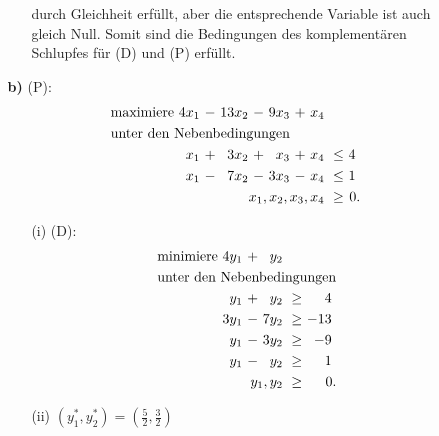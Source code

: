 \documentclass [a4paper,11pt]{article}
\begin{document}
\begin{enumerate}
\begin{enumerate}
\begin{enumerate}
                durch Gleichheit erfüllt, aber die entsprechende Variable ist auch gleich Null. Somit sind die Bedingungen des komplementären Schlupfes für (D)
                und (P) erfüllt.
            \end{enumerate}
        \item[\textbf{b)}]
            (P):
            \begin{align*}
            \begin{alignedat}{6}
            & \text{maximiere } & 4x_1 &\ - &\ 13x_2 &\ - &\ 9x_3 &\ + &\  x_4 & & \\
            & \rlap{unter den Nebenbedingungen} & & & & & & & & & \\
            &&  x_1 &\ + &\ 3x_2 &\ + &\  x_3 &\ + &\ x_4 &\ \leq &\ 4\ \\
            &&  x_1 &\ - &\ 7x_2 &\ - &\ 3x_3 &\ - &\ x_4 &\ \leq &\ 1\ \\
            && & & & & & & \llap{$x_1,x_2,x_3,x_4$} &\ \geq &\ 0.
            \end{alignedat}
            \end{align*}

            \begin{enumerate}
                \item[(i)]
                    (D):
                    \begin{align*}
                    \begin{alignedat}{4}
                    & \text{minimiere } & 4y_1 &\ + &\ y_2 & & \\
                    & \rlap{unter den Nebenbedingungen} & & & & & \\
                    &&  y_1 &\ + &\  y_2 &\ \geq &\ 4\ \\
                    && 3y_1 &\ - &\ 7y_2 &\ \geq &\ -13\ \\
                    &&  y_1 &\ - &\ 3y_2 &\ \geq &\ -9\ \\
                    &&  y_1 &\ - &\  y_2 &\ \geq &\ 1\ \\
                    && & & \llap{$y_1,y_2$} &\ \geq &\ 0.
                    \end{alignedat}
                    \end{align*}

                \item[(ii)]
                    $ (y_1^*,y_2^*) = (\frac{5}{2},\frac{3}{2}) $


\end{enumerate}
\end{enumerate}
\end{enumerate}
\end{document}
